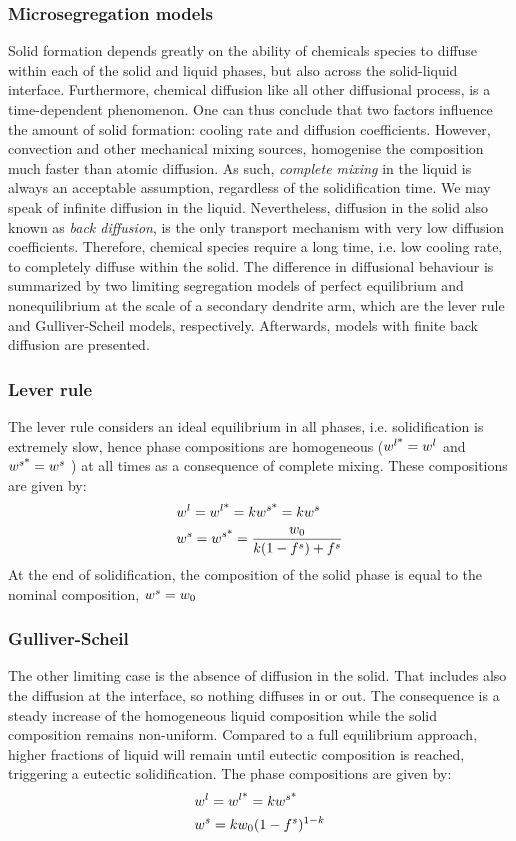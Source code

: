\subsubsection{Microsegregation models}
Solid formation depends greatly on the ability of chemicals species to diffuse within each of the solid and liquid phases, but also across the
solid-liquid interface. Furthermore, chemical diffusion like all other diffusional process, is a time-dependent phenomenon. One can thus conclude that two factors
influence the amount of solid formation: cooling rate and diffusion coefficients. However, convection and other mechanical mixing sources, 
homogenise the composition much faster than atomic diffusion. As such, \emph{complete mixing} in the liquid is always an acceptable assumption, regardless of the 
solidification time. We may speak of infinite diffusion in the liquid. Nevertheless, diffusion in the solid also known as \emph{back diffusion}, is the only transport mechanism with very low diffusion coefficients. Therefore, chemical species require a long time, i.e. low cooling rate, to completely diffuse within the solid.
The difference in diffusional behaviour is summarized by two limiting segregation models of perfect equilibrium and nonequilibrium at the scale
of a secondary dendrite arm, which are the lever rule and Gulliver-Scheil models, respectively. Afterwards, models with finite back diffusion are presented. 
%
%
\subsubsection*{Lever rule}
The lever rule considers an ideal equilibrium in all phases, i.e. solidification is extremely slow, hence phase compositions are 
homogeneous ($ {w}^{l \text{*}}  = {w}^l$ and $ {w}^{s \text{*}}  = {w}^s$ ) at all times as a consequence of complete mixing. 
These compositions are given by:
\begin{align}
\label{eq:leverrule}
& {w}^l= {w}^{l \text{*}}  = k {w}^{s \text{*}}  = k {w}^s \\
& {w}^s= {w}^{s \text{*}}  = \frac{{w}_0}{k(1-{f^s}) + {f^s}}
\end{align}
At the end of solidification, the composition of the solid phase is equal to the nominal composition, ${w}^s = {w}_0$
%
%
\subsubsection*{Gulliver-Scheil}
The other limiting case is the absence of diffusion in the solid. That includes also the diffusion at the interface, so nothing diffuses in or out. The consequence is a steady increase of the homogeneous liquid composition while the solid composition remains non-uniform.
Compared to a full equilibrium approach, higher fractions of liquid
will remain until eutectic composition is reached, triggering a eutectic solidification. The phase compositions are given by:
\begin{align}
\label{eq:scheil}
& {w}^l= {w}^{l \text{*}}  = k {w}^{s \text{*}}  \\
& {w}^s= k {w}_0 (1-{f^s})^{1-k}
\end{align}
%
%
